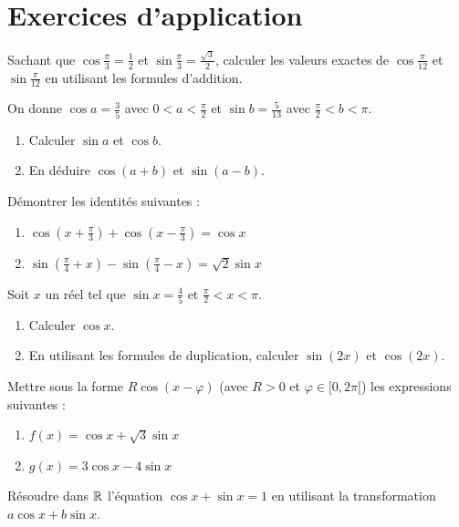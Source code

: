 \section{Exercices d'application}


\exo{}
Sachant que $\cos\frac{\pi}{3} = \frac12$ et $\sin\frac{\pi}{3} = \frac{\sqrt3}{2}$, calculer les valeurs exactes de $\cos\frac{\pi}{12}$ et $\sin\frac{\pi}{12}$ en utilisant les formules d'addition.

\exo{}
On donne $\cos a = \frac35$ avec $0 < a < \frac{\pi}{2}$ et $\sin b = \frac{5}{13}$ avec $\frac{\pi}{2} < b < \pi$.
\begin{enumerate}[label=\alph*)]
    \item Calculer $\sin a$ et $\cos b$.
    \item En déduire $\cos(a+b)$ et $\sin(a-b)$.
\end{enumerate}

\exo{}
Démontrer les identités suivantes :
\begin{enumerate}[label=\alph*)]
    \item $\cos\left(x+\frac{\pi}{3}\right) + \cos\left(x-\frac{\pi}{3}\right) = \cos x$
    \item $\sin\left(\frac{\pi}{4}+x\right) - \sin\left(\frac{\pi}{4}-x\right) = \sqrt2\sin x$
\end{enumerate}

\exo{}
Soit $x$ un réel tel que $\sin x = \frac{4}{5}$ et $\frac{\pi}{2} < x < \pi$.
\begin{enumerate}[label=\alph*)]
    \item Calculer $\cos x$.
    \item En utilisant les formules de duplication, calculer $\sin(2x)$ et $\cos(2x)$.
\end{enumerate}


\exo{}
Mettre sous la forme $R\cos(x-\varphi)$ (avec $R>0$ et $\varphi\in[0,2\pi[$) les expressions suivantes :
\begin{enumerate}[label=\alph*)]
    \item $f(x) = \cos x + \sqrt3\sin x$
    \item $g(x) = 3\cos x - 4\sin x$
\end{enumerate}

\exo{}
Résoudre dans $\mathbb{R}$ l'équation $\cos x + \sin x = 1$ en utilisant la transformation $a\cos x + b\sin x$.

